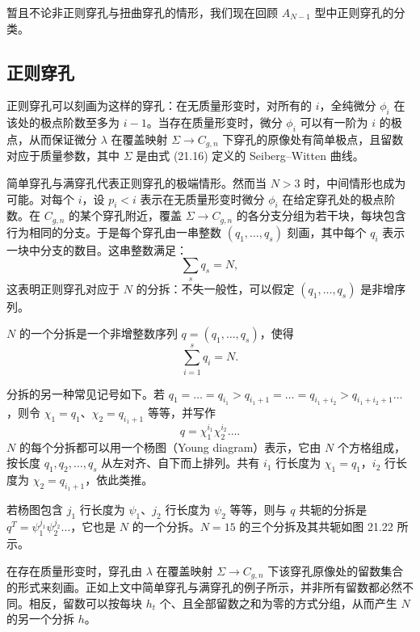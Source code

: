 暂且不论非正则穿孔与扭曲穿孔的情形，我们现在回顾 $A_{N-1}$ 型中正则穿孔的分类。

\subsection{正则穿孔}

\begin{proposition}[21.39] 正则穿孔可以刻画为这样的穿孔：在无质量形变时，对所有的 $i$，全纯微分 $\phi_i$ 在该处的极点阶数至多为 $i-1$。当存在质量形变时，微分 $\phi_i$ 可以有一阶为 $i$ 的极点，从而保证微分 $\lambda$ 在覆盖映射 $\Sigma\to C_{g,n}$ 下穿孔的原像处有简单极点，且留数对应于质量参数，其中 $\Sigma$ 是由式 (21.16) 定义的 Seiberg–Witten 曲线。
\end{proposition}

简单穿孔与满穿孔代表正则穿孔的极端情形。然而当 $N>3$ 时，中间情形也成为可能。对每个 $i$，设 $p_i<i$ 表示在无质量形变时微分 $\phi_i$ 在给定穿孔处的极点阶数。在 $C_{g,n}$ 的某个穿孔附近，覆盖 $\Sigma\to C_{g,n}$ 的各分支分组为若干块，每块包含行为相同的分支。于是每个穿孔由一串整数 $(q_1,\dots,q_s)$ 刻画，其中每个 $q_i$ 表示一块中分支的数目。这串整数满足：
\[
\sum_s q_s=N,
\]
这表明正则穿孔对应于 $N$ 的分拆：不失一般性，可以假定 $(q_1,\dots,q_s)$ 是非增序列。

\begin{definition}[21.40] $N$ 的一个分拆是一个非增整数序列 $q=(q_1,\dots,q_s)$，使得
\[
\sum_{i=1}^{s}q_i=N.
\]
\end{definition}

分拆的另一种常见记号如下。若 $q_1=\dots=q_{i_1}>q_{i_1+1}=\dots=q_{i_1+i_2}>q_{i_1+i_2+1}\dots$，则令 $\chi_1=q_1$、$\chi_2=q_{i_1+1}$ 等等，并写作
\[
q=\chi_1^{i_1}\chi_2^{i_2}\dots.
\]
$N$ 的每个分拆都可以用一个杨图（Young diagram）表示，它由 $N$ 个方格组成，按长度 $q_1,q_2,\dots,q_s$ 从左对齐、自下而上排列。共有 $i_1$ 行长度为 $\chi_1=q_1$，$i_2$ 行长度为 $\chi_2=q_{i_1+1}$，依此类推。

若杨图包含 $j_1$ 行长度为 $\psi_1$、$j_2$ 行长度为 $\psi_2$ 等等，则与 $q$ 共轭的分拆是 $q^T=\psi_1^{j_1}\psi_2^{j_2}\dots$，它也是 $N$ 的一个分拆。$N=15$ 的三个分拆及其共轭如图 21.22 所示。


在存在质量形变时，穿孔由 $\lambda$ 在覆盖映射 $\Sigma\to C_{g,n}$ 下该穿孔原像处的留数集合的形式来刻画。正如上文中简单穿孔与满穿孔的例子所示，并非所有留数都必然不同。相反，留数可以按每块 $h_t$ 个、且全部留数之和为零的方式分组，从而产生 $N$ 的另一个分拆 $h$。


